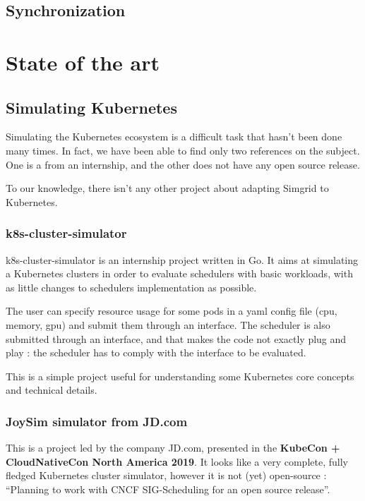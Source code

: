 \documentclass[12pt]{report}
\begin{document}
\section{Synchronization}

\chapter{State of the art}

\section{Simulating Kubernetes}

Simulating the Kubernetes ecosystem is a difficult task that hasn't been done
many times. In fact, we have been able to find only two references on the
subject. One is a from an internship, and the other does not have any open
source release.

To our knowledge, there isn't any other project about adapting Simgrid to
Kubernetes.

\subsection{k8s-cluster-simulator}

k8s-cluster-simulator\cite{kubesim} is an internship project written in Go. It
aims at simulating a Kubernetes clusters in order to evaluate schedulers with
basic workloads, with as little changes to schedulers implementation as
possible.

The user can specify resource usage for some pods in a yaml config file (cpu,
memory, gpu) and submit them through an interface. The scheduler is also
submitted through an interface, and that makes the code not exactly plug and
play : the scheduler has to comply with the interface to be evaluated.

This is a simple project useful for understanding some Kubernetes core concepts
and technical details.

\subsection{JoySim simulator from JD.com}

This is a project led by the company JD.com, presented in the \textbf{KubeCon +
	CloudNativeCon North America 2019}\cite{joysim}. It looks like a very
complete, fully fledged Kubernetes cluster simulator, however it is not (yet)
open-source : ``Planning to work with CNCF SIG-Scheduling for an open source
release''.
\end{document}
